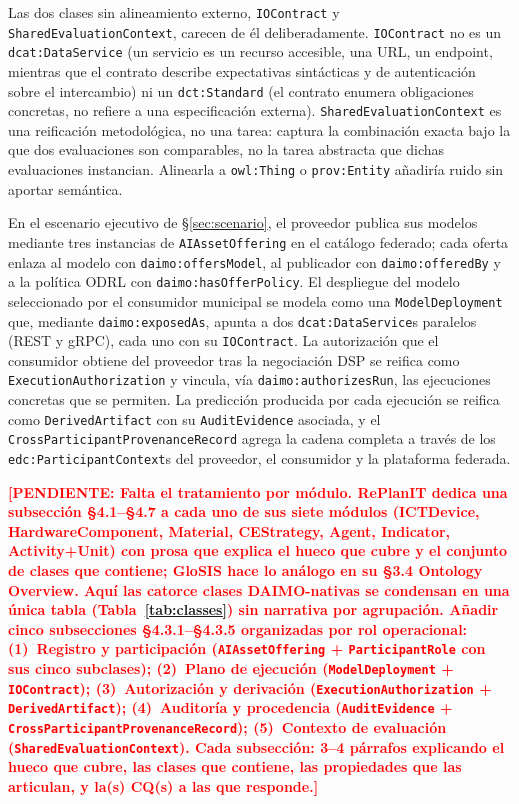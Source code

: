 \documentclass[Afour,sagev,times]{sagej}
\newcommand{\code}[1]{\texttt{#1}}
\newcommand{\TODO}[1]{\textcolor{red}{\textbf{[PENDIENTE: #1]}}}
\begin{document}
Las dos clases sin alineamiento externo, \code{IOContract} y \code{SharedEvaluationContext}, carecen de él deliberadamente. \code{IOContract} no es un \code{dcat:DataService} (un servicio es un recurso accesible, una URL, un endpoint, mientras que el contrato describe expectativas sintácticas y de autenticación sobre el intercambio) ni un \code{dct:Standard} (el contrato enumera obligaciones concretas, no refiere a una especificación externa). \code{SharedEvaluationContext} es una reificación metodológica, no una tarea: captura la combinación exacta bajo la que dos evaluaciones son comparables, no la tarea abstracta que dichas evaluaciones instancian. Alinearla a \code{owl:Thing} o \code{prov:Entity} añadiría ruido sin aportar semántica.

En el escenario ejecutivo de §\ref{sec:scenario}, el proveedor publica sus modelos mediante tres instancias de \code{AIAssetOffering} en el catálogo federado; cada oferta enlaza al modelo con \code{daimo:offersModel}, al publicador con \code{daimo:offeredBy} y a la política ODRL con \code{daimo:hasOfferPolicy}. El despliegue del modelo seleccionado por el consumidor municipal se modela como una \code{ModelDeployment} que, mediante \code{daimo:exposedAs}, apunta a dos \code{dcat:DataService}s paralelos (REST y gRPC), cada uno con su \code{IOContract}. La autorización que el consumidor obtiene del proveedor tras la negociación DSP se reifica como \code{ExecutionAuthorization} y vincula, vía \code{daimo:authorizesRun}, las ejecuciones concretas que se permiten. La predicción producida por cada ejecución se reifica como \code{DerivedArtifact} con su \code{AuditEvidence} asociada, y el \code{CrossParticipantProvenanceRecord} agrega la cadena completa a través de los \code{edc:ParticipantContext}s del proveedor, el consumidor y la plataforma federada.

\TODO{Falta el tratamiento por módulo. RePlanIT dedica una subsección \S4.1--\S4.7 a cada uno de sus siete módulos (ICTDevice, HardwareComponent, Material, CEStrategy, Agent, Indicator, Activity+Unit) con prosa que explica el hueco que cubre y el conjunto de clases que contiene; GloSIS hace lo análogo en su \S3.4 Ontology Overview. Aquí las catorce clases DAIMO-nativas se condensan en una única tabla (Tabla~\ref{tab:classes}) sin narrativa por agrupación. Añadir cinco subsecciones \S4.3.1--\S4.3.5 organizadas por rol operacional: (1)~Registro y participación (\code{AIAssetOffering} + \code{ParticipantRole} con sus cinco subclases); (2)~Plano de ejecución (\code{ModelDeployment} + \code{IOContract}); (3)~Autorización y derivación (\code{ExecutionAuthorization} + \code{DerivedArtifact}); (4)~Auditoría y procedencia (\code{AuditEvidence} + \code{CrossParticipantProvenanceRecord}); (5)~Contexto de evaluación (\code{SharedEvaluationContext}). Cada subsección: 3--4 párrafos explicando el hueco que cubre, las clases que contiene, las propiedades que las articulan, y la(s) CQ(s) a las que responde.}
\end{document}
